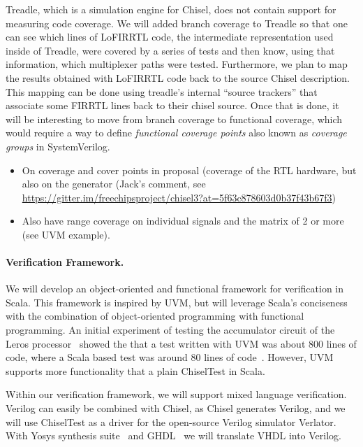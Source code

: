 \documentclass[conference]{IEEEtran}
\begin{document}
Treadle, which is a simulation engine for Chisel, does not contain support for measuring code coverage.
We will added branch coverage to Treadle so that one can see which lines of
LoFIRRTL code, the intermediate representation used inside of Treadle, were covered by a series of tests
and then know, using that information, which multiplexer paths were tested. 
Furthermore, we plan to map the results obtained with LoFIRRTL code back to the source Chisel description.
This mapping can be done using treadle's internal ``source trackers'' that associate some FIRRTL lines back
to their chisel source. Once that is done, it will be interesting to move from branch coverage to functional
coverage, which would require a way to define \textit{functional coverage points} also known as
\textit{coverage groups} in SystemVerilog.

\begin{itemize}
\item On coverage and cover points in proposal (coverage of the RTL hardware, but also on the generator (Jack's comment, see \url{https://gitter.im/freechipsproject/chisel3?at=5f63c878603d0b37f43b67f3})
\item Also have range coverage on individual signals and the matrix of 2 or more (see UVM example).
\end{itemize}



\paragraph{Verification Framework.}

We will develop an object-oriented and functional framework for verification in Scala.
This framework is inspired by UVM, but will leverage Scala's conciseness with the
combination of object-oriented programming with functional programming.
An initial experiment of testing the accumulator circuit of the Leros processor~\cite{leros:arcs2019}
showed the that a test written with UVM was about 800 lines of code, where a Scala based
test was around 80 lines of code~\cite{verify:chisel:2020}.
However, UVM supports more functionality that a plain ChiselTest in Scala.

Within our verification framework, we will support mixed language verification.
Verilog can easily be combined with Chisel, as Chisel generates Verilog, and
we will use ChiselTest as a driver for the open-source Verilog simulator Verlator.
With Yosys synthesis suite~\cite{Yosys} and GHDL~\cite{ghdl}
we will translate VHDL into Verilog.
\end{document}
